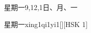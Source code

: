 \begin{entry}{星期一}{9,12,1}{⽇、⽉、⼀}
  \begin{phonetics}{星期一}{xing1qi1yi1}[][HSK 1]
  \end{phonetics}
\end{entry}
